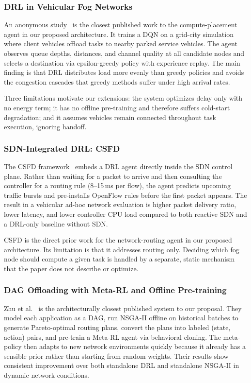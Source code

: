 \documentclass[12pt,a4paper]{article}
\begin{document}
\subsubsection{DRL in Vehicular Fog Networks}

An anonymous study~\cite{vfc_drl2024} is the closest published work to the
compute-placement agent in our proposed architecture. It trains a DQN on a
grid-city simulation where client vehicles offload tasks to nearby parked service
vehicles. The agent observes queue depths, distances, and channel quality at all
candidate nodes and selects a destination via epsilon-greedy policy with experience
replay. The main finding is that DRL distributes load more evenly than greedy
policies and avoids the congestion cascades that greedy methods suffer under high
arrival rates.

Three limitations motivate our extensions: the system optimizes delay only with no
energy term; it has no offline pre-training and therefore suffers cold-start
degradation; and it assumes vehicles remain connected throughout task execution,
ignoring handoff.

\subsubsection{SDN-Integrated DRL: CSFD}

The CSFD framework~\cite{csfd2025} embeds a DRL agent directly inside the SDN
control plane. Rather than waiting for a packet to arrive and then consulting the
controller for a routing rule (8--15\,ms per flow), the agent predicts upcoming
traffic bursts and pre-installs OpenFlow rules before the first packet appears.
The result in a vehicular ad-hoc network evaluation is higher packet delivery
ratio, lower latency, and lower controller CPU load compared to both reactive SDN
and a DRL-only baseline without SDN.

CSFD is the direct prior work for the network-routing agent in our proposed
architecture. Its limitation is that it addresses routing only. Deciding which
fog node should compute a given task is handled by a separate, static mechanism
that the paper does not describe or optimize.

\subsubsection{DAG Offloading with Meta-RL and Offline Pre-training}

Zhu et al.~\cite{zhu2025dag} is the architecturally closest published system to
our proposal. They model each application as a DAG, run NSGA-II offline on
historical batches to generate Pareto-optimal routing plans, convert the plans
into labeled (state, action) pairs, and pre-train a Meta-RL agent via behavioral
cloning. The meta-policy then adapts to new network environments quickly because
it already has a sensible prior rather than starting from random weights. Their
results show consistent improvement over both standalone DRL and standalone NSGA-II
in dynamic network conditions.
\end{document}
